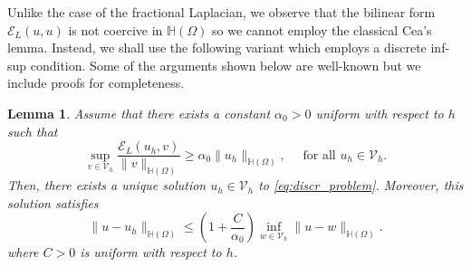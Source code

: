 \documentclass[10 pt]{article}
\newtheorem{lemma}[theorem]{Lemma}
\numberwithin{equation}{section}
\def\cE{\mathcal{E}}
\begin{document}
Unlike the case of the fractional Laplacian, we observe that the bilinear form $\cE_{L}(u,u)$ is not coercive in $\mathbb H(\Omega)$ so we cannot employ the classical Cea's lemma. Instead, we shall use the following variant which employs a discrete inf-sup condition. Some of the arguments shown below are well-known but we include proofs for completeness. 
%
\begin{lemma}\label{lem:cea_mg}
Assume that there exists a constant $\alpha_0>0$ uniform with respect to $h$ such that
%
\begin{equation}\label{eq:discr_inf_sup}
    \sup_{v\in \mathcal V_h}\frac{\cE_{L}(u_h,v)}{\|v\|_{\mathbb H(\Omega)}}\geq \alpha_0\|u_h\|_{\mathbb H(\Omega)}, \quad\text{ for all } u_h\in\mathcal V_h.
\end{equation}
%
Then, there exists a unique solution $u_h\in \mathcal V_h$ to \eqref{eq:discr_problem}. Moreover, this solution satisfies
%
\begin{equation}\label{eq:stability_cea}
    \|u-u_h\|_{\mathbb H(\Omega)}\leq \left(1+\frac{C}{\alpha_0}\right)\inf_{w\in\mathcal V_h}\|u-w\|_{\mathbb H(\Omega)}.
\end{equation}
%
where $C>0$ is uniform with respect to $h$.
\end{lemma}
%
\end{document}
